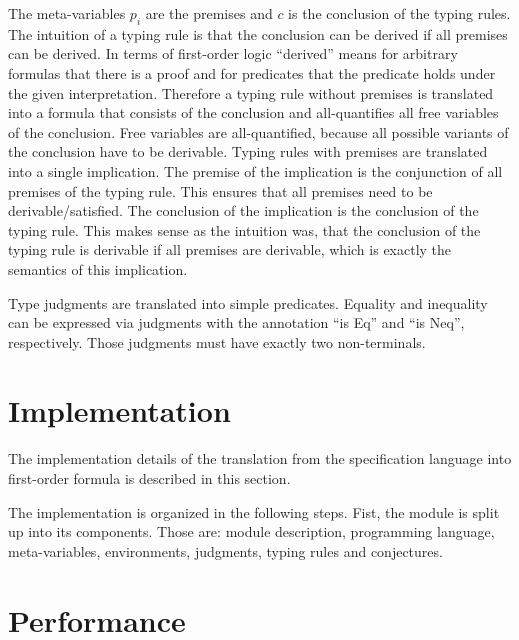 The meta-variables $p_i$ are the premises and $c$ is the conclusion of
the typing rules. The intuition of a typing rule is that the
conclusion can be derived if all premises can be derived. In terms of
first-order logic ``derived'' means for arbitrary formulas that there
is a proof and for predicates that the predicate holds under the given
interpretation. Therefore a typing rule without premises is translated
into a formula that consists of the conclusion and all-quantifies all
free variables of the conclusion. Free variables are all-quantified,
because all possible variants of the conclusion have to be derivable.
Typing rules with premises are translated into a single
implication. The premise of the implication is the conjunction of all
premises of the typing rule. This ensures that all premises need to be
derivable/satisfied. The conclusion of the implication is the
conclusion of the typing rule. This makes sense as the intuition was,
that the conclusion of the typing rule is derivable if all premises
are derivable, which is exactly the semantics of this implication.

Type judgments are translated into simple predicates. Equality and
inequality can be expressed via judgments with the annotation ``is
Eq'' and ``is Neq'', respectively. Those judgments must have exactly
two non-terminals.
\section{Implementation}
The implementation details of the translation from the specification
language into first-order formula is described in this section.

The implementation is organized in the following steps. Fist, the
module is split up into its components. Those are: module description,
programming language, meta-variables, environments, judgments, typing
rules and conjectures. 

\section{Performance}
